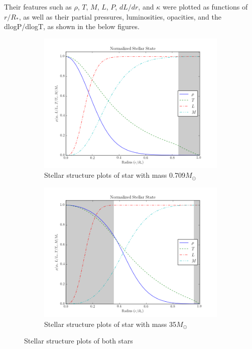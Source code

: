 \documentclass[11pt]{article}
\begin{document}
Their features such as $\rho$, $T$, $M$, $L$, $P$, $dL/dr$, and $\kappa$ were plotted as functions of $r/R_*$, as well as their partial pressures, luminosities, opacities, and the dlogP/dlogT, as shown in the below figures. \\

\begin{figure}[h!]
\centering
\begin{subfigure}{.5\textwidth}
  \centering
  \includegraphics[scale=0.5]{plots/star_comp-_X-0.73,Y-0.25,Z-0.02__Tc-9000000.0/stellar_state.png}
  \caption{Stellar structure plots of star with mass 0.709$M_\odot$}
  \label{fig:sssmall}
\end{subfigure}%
\begin{subfigure}{.5\textwidth}
  \centering
  \includegraphics[scale=0.5]{plots/star_comp-_X-0.73,Y-0.25,Z-0.02__Tc-33000000.0/stellar_state.png}
  \caption{Stellar structure plots of star with mass 35$M_\odot$}
  \label{fig:ssbig}
\end{subfigure}
\caption{Stellar structure plots of both stars}
\label{fig:ss}
\end{figure}
\end{document}
